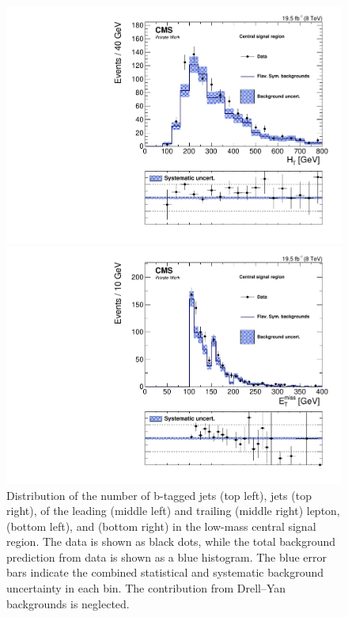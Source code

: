 \begin{figure}[htbp]
\begin{minipage}[t]{0.49\textwidth}
  \includegraphics[width=\textwidth]{plots/results/rSFOFDependencies/rSFOFDependency_SignalCentral_HT_Full2012_SF_lowMass.pdf}
\end{minipage}
\begin{minipage}[t]{0.49\textwidth}
\includegraphics[width=\textwidth]{plots/results/rSFOFDependencies/rSFOFDependency_SignalCentral_MET_Full2012_SF_lowMass.pdf}
\end{minipage}
\caption{Distribution of the number of b-tagged jets (top left), jets (top right), \pt of the leading (middle left) and trailing (middle right) lepton, \HT (bottom left), and \MET (bottom right) in the low-mass central signal region. The data is shown as black dots, while the total background prediction from data is shown as a blue histogram. The blue error bars indicate the combined statistical and systematic background uncertainty in each bin. The contribution from Drell--Yan backgrounds is neglected.}
\label{fig:dependencies}
\end{figure}


